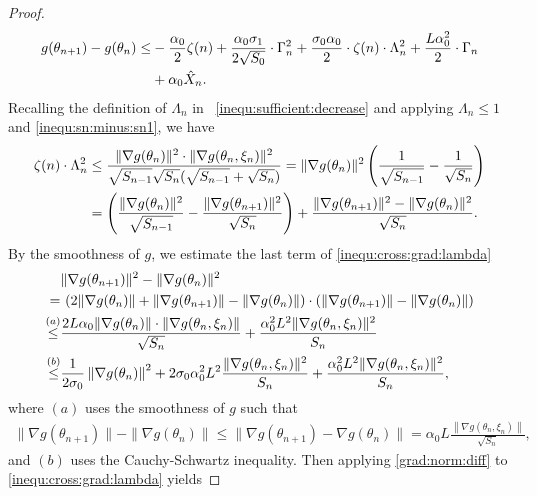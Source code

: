 \documentclass[standalone]{article}
\begin{document}
\begin{proof}
\begin{align}
g(\theta_{n+1})-g(\theta_{n})  \le & - \frac{\alpha_{0}}{2} \zeta(n)+\frac{\alpha_{0}\sigma_{1}}{2\sqrt{S_{0}}}\cdot \Gamma_n^2 +\frac{\sigma_{0}\alpha_{0}}{2}\cdot \zeta(n)\cdot \Lambda_n^2 +\frac{ L\alpha_{0}^{2}}{2}\cdot  \Gamma_n\notag\\&+ \alpha_0 \hat{X}_{n}.
\end{align}
Recalling the definition of $\Lambda_n$ in ~\cref{inequ:sufficient:decrease} and applying $\Lambda_n \leq 1$ and \cref{inequ:sn:minus:sn1}, we have 
\begin{align}\label{inequ:cross:grad:lambda}
\zeta(n)\cdot \Lambda_n^2 & \leq   \frac{\|\nabla g(\theta_{n})\|^{2} \cdot \|\nabla g(\theta_{n}, \xi_n)\|^{2}}{\sqrt{S_{n-1}}\sqrt{S_{n}}(\sqrt{S_{n-1}} + \sqrt{S_n})} = \|\nabla g(\theta_{n})\|^{2} \left(\frac{1}{\sqrt{S_{n-1}}}-\frac{1}{\sqrt{S_{n}}} \right) \notag \\
& = \left(\frac{\|\nabla g(\theta_{n})\|^{2}}{\sqrt{S_{n-1}}}-\frac{\|\nabla g(\theta_{n+1})\|^{2}}{\sqrt{S_{n}}}\right) + \frac{\|\nabla g(\theta_{n+1})\|^{2}-\|\nabla g(\theta_{n})\|^{2}}{\sqrt{S_{n}}}. 
\end{align}
By the smoothness of $g$, we estimate the last term of \cref{inequ:cross:grad:lambda}
\begin{align}\label{grad:norm:diff}
&\|\nabla g(\theta_{n+1})\|^{2}-\|\nabla g(\theta_{n})\|^{2} \notag \\
=&\ (2\|\nabla g(\theta_{n})\|+\|\nabla g(\theta_{n+1})\|-\|\nabla g(\theta_{n})\|)\cdot(\|\nabla g(\theta_{n+1})\|-\|\nabla g(\theta_{n})\|) \notag \\ \mathop{\leq}^{(a)} &\frac{2 L\alpha_{0}\|\nabla g(\theta_{n})\|\cdot\|\nabla g(\theta_{n},\xi_{n})\|}{\sqrt{S_{n}}}+\frac{\alpha_{0}^{2} L^{2}\|\nabla g(\theta_{n},\xi_{n})\|^{2}}{S_{n}} \notag \\
\mathop{\leq}^{(b)} &\frac{1}{2\sigma_0}\left\| \nabla g(\theta_{n})\right\|^2 + 2\sigma_0\alpha_0^2 L^2\frac{\|\nabla g(\theta_{n},\xi_{n})\|^{2}}{S_{n}} + \frac{\alpha_{0}^{2} L^{2}\|\nabla g(\theta_{n},\xi_{n})\|^{2}}{S_{n}},
\end{align}
where $(a)$ uses the smoothness of $g$ such that
\begin{align*}
\|\nabla g(\theta_{n+1})\|-\|\nabla g(\theta_{n})\| \leq \|\nabla g(\theta_{n+1}) - \nabla g(\theta_{n})\| = \alpha_0  L \frac{\left\|\nabla g(\theta_n, \xi_n) \right\|}{\sqrt{S_n}},
\end{align*}
and $(b)$ uses the Cauchy-Schwartz inequality.
Then applying \cref{grad:norm:diff} to \cref{inequ:cross:grad:lambda} yields

\end{proof}
\end{document}
